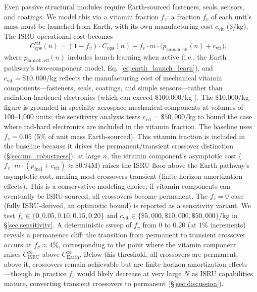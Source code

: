 \documentclass[preprint,12pt]{elsarticle}
\begin{document}
Even passive structural modules require Earth-sourced fasteners, seals, sensors, and coatings. We model this via a vitamin fraction $f_v$: a fraction $f_v$ of each unit's mass must be launched from Earth, with its own manufacturing cost $c_{\mathrm{vit}}$ (\$/kg). The ISRU operational cost becomes
\begin{equation}
  C_{\mathrm{ops}}^{\mathrm{vit}}(n) = (1 - f_v) \cdot C_{\mathrm{ops}}(n) + f_v \cdot m \cdot \bigl(p_{\mathrm{launch,eff}}(n) + c_{\mathrm{vit}}\bigr),
  \label{eq:vitamin}
\end{equation}
where $p_{\mathrm{launch,eff}}(n)$ includes launch learning when active (i.e., the Earth pathway's two-component model, Eq.~\ref{eq:earth_launch_learn}), and $c_{\mathrm{vit}} = \$10{,}000$/kg reflects the manufacturing cost of mechanical vitamin components---fasteners, seals, coatings, and simple sensors---rather than radiation-hardened electronics (which can exceed \$100{,}000/kg \cite{wertz2011}). The \$10{,}000/kg figure is grounded in specialty aerospace mechanical components at volumes of 100--1{,}000 units; the sensitivity analysis tests $c_{\mathrm{vit}} = \$50{,}000$/kg to bound the case where rad-hard electronics are included in the vitamin fraction. The baseline uses $f_v = 0.05$ (5\% of unit mass Earth-sourced). This vitamin fraction is included in the baseline because it drives the permanent/transient crossover distinction (\S\ref{sec:mc_robustness}): at large $n$, the vitamin component's asymptotic cost ($f_v \cdot m \cdot (p_{\mathrm{fuel}} + c_{\mathrm{vit}}) \approx \$0.94$M) raises the ISRU floor above the Earth pathway's asymptotic cost, making most crossovers transient (finite-horizon amortization effects). This is a conservative modeling choice; if vitamin components can eventually be ISRU-sourced, all crossovers become permanent. The $f_v = 0$ case (fully ISRU-derived, an optimistic bound) is reported as a sensitivity variant. We test $f_v \in \{0, 0.05, 0.10, 0.15, 0.20\}$ and $c_{\mathrm{vit}} \in \{\$5{,}000, \$10{,}000, \$50{,}000\}$/kg in \S\ref{sec:sensitivity}. A deterministic sweep of $f_v$ from 0 to 0.20 (at 1\% increments) reveals a permanence cliff: the transition from permanent to transient crossover occurs at $f_v \approx 4\%$, corresponding to the point where the vitamin component raises $C_{\mathrm{ISRU}}^{\infty}$ above $C_{\mathrm{Earth}}^{\infty}$. Below this threshold, all crossovers are permanent; above it, crossovers remain achievable but are finite-horizon amortization effects---though in practice $f_v$ would likely decrease at very large $N$ as ISRU capabilities mature, converting transient crossovers to permanent (\S\ref{sec:discussion}).
\end{document}
